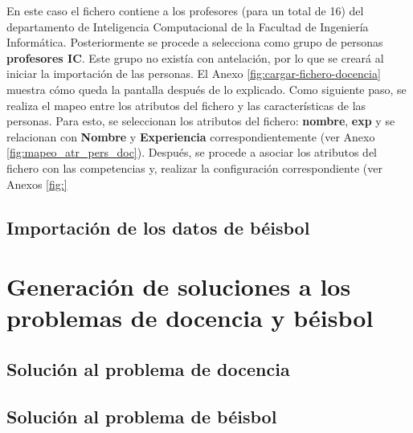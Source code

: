 En este caso el fichero contiene a los profesores (para un total de 16) del departamento de Inteligencia Computacional de la Facultad de Ingeniería Informática. Posteriormente se procede a selecciona como grupo de personas \textbf{profesores IC}. Este grupo no existía con antelación, por lo que se creará al iniciar la importación de las personas. El Anexo \ref{fig:cargar-fichero-docencia} muestra cómo queda la pantalla después de lo explicado. Como siguiente paso, se realiza el mapeo entre los atributos del fichero y las características de las personas. Para esto, se seleccionan los atributos del fichero: \textbf{nombre}, \textbf{exp} y se relacionan con \textbf{Nombre} y \textbf{Experiencia} correspondientemente (ver Anexo \ref{fig:mapeo_atr_pers_doc}). Después, se procede a asociar los atributos del fichero con las competencias y, realizar la configuración correspondiente (ver Anexos \ref{fig:}

\subsection{Importación de los datos de  béisbol}



\section{Generación de soluciones a los problemas de docencia y béisbol}

\subsection{Solución al problema de docencia}

\subsection{Solución al problema de  béisbol}




